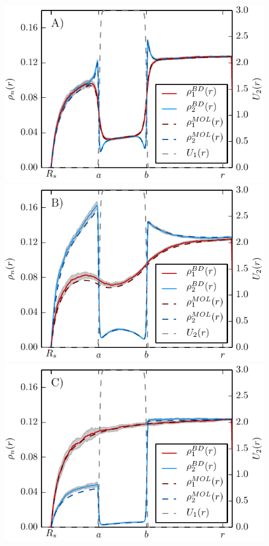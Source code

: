\begin{minipage}[t]{.66 \textwidth}
     \begin{figure}[H]
        \hspace{-1.2cm } \includegraphics[width = 1 \textwidth]{plots/rd025_numeric.pdf} \\
        \vspace{.4 cm} \hspace{-1.2cm } \includegraphics[width = 1 \textwidth]{plots/rd25_numeric.pdf} \\
        \vspace{.4 cm} \hspace{-1.2cm } \includegraphics[width = 1 \textwidth]{plots/rd250_numeric.pdf}

\end{figure}
\end{minipage}
